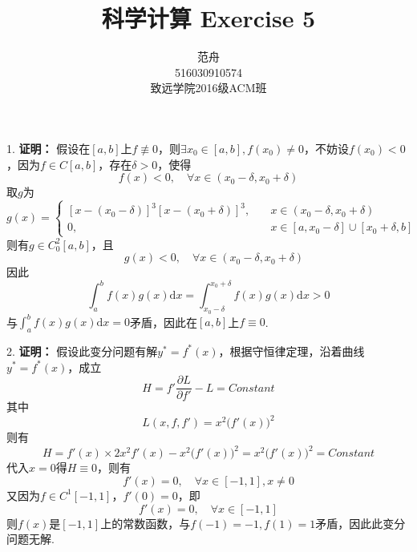 \documentclass[12pt, a4paper]{article}
\title{科学计算 Exercise 5}
\author{范舟\\516030910574\\致远学院2016级ACM班}
\date{}
\theoremstyle{margin}
\begin{document}
\maketitle

1. \textbf{证明： } 假设在$[a, b]$上$f\not\equiv0$，则$\exists x_0 \in [a, b], f(x_0) \neq 0$，不妨设$f(x_0) < 0$，因为$f \in C[a, b]$，存在$\delta > 0$，使得
\[f(x) < 0, \quad \forall x \in (x_0 - \delta, x_0 + \delta)\]
取$g$为
\[g(x)=
\begin{cases}
[x - (x_0 - \delta)]^3 [x - (x_0 + \delta)]^3, \quad & x \in (x_0 - \delta, x_0 + \delta) \\
0, \quad & x \in [a, x_0 - \delta] \cup [x_0 + \delta, b]
\end{cases}
\]
则有$g \in C^{2}_{0}[a, b]$，且
\[\quad g(x) < 0, \quad \forall x \in (x_0 - \delta, x_0 + \delta)\]
因此
\[\int_{a}^{b}f(x)g(x)\mathrm{d}x = \int_{x_0 - \delta}^{x_0 + \delta}f(x)g(x)\mathrm{d}x > 0\]
与$\int_{a}^{b}f(x)g(x)\mathrm{d}x = 0$矛盾，因此在$[a, b]$上$f \equiv 0$.
\newline

2. \textbf{证明： } 假设此变分问题有解$y^{*} = f^{*}(x)$，根据守恒律定理，沿着曲线$y^{*} = f^{*}(x)$，成立
\[H = f'\frac{\partial L}{\partial f'} - L = Constant\]
其中
\[L(x, f, f') = x^2\big(f'(x)\big)^2\]
则有
\[H = f'(x) \times 2x^2f'(x) - x^2\big(f'(x)\big)^2 = x^2\big(f'(x)\big)^2 = Constant\]
代入$x = 0$得$H \equiv 0$，则有
\[f'(x) = 0, \quad \forall x \in [-1, 1], x \ne 0\]
又因为$f \in C^{1}[-1, 1]$，$f'(0) = 0$，即
\[f'(x) = 0, \quad \forall x \in [-1, 1]\]
则$f(x)$是$[-1, 1]$上的常数函数，与$f(-1) = -1, f(1) = 1$矛盾，因此此变分问题无解.
\newline
\end{document}
